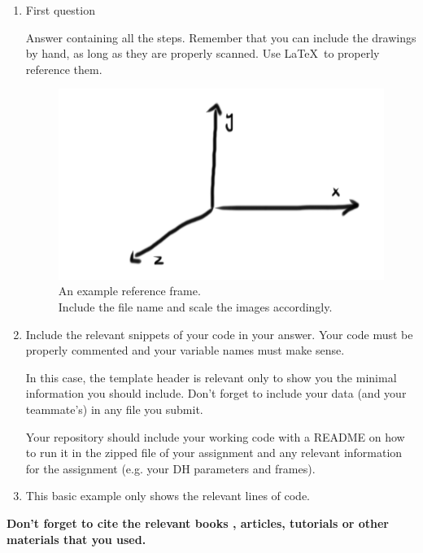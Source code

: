 \documentclass[paper=a4, fontsize=11pt]{scrartcl}
\begin{document}
\begin{enumerate}
	\item First question
	
	Answer containing all the steps. Remember that you can include the drawings by hand, as long as they are properly scanned. Use \LaTeX ~to properly reference them. 
	\begin{figure}[h]
		\label{fig:frame}
		\begin{center}
			\caption{An example reference frame. \\ Include the file name and scale the images accordingly.}
			\includegraphics[width=.3\textwidth]{images/Frame}
		\end{center}	
	\end{figure}
	
	\item Include the relevant snippets of your code in your answer. 
	Your code must be properly commented and your variable names must make sense.
	 
	In this case, the template header is relevant only to show you the minimal information you should include. Don't forget to include your data (and your teammate's) in any file you submit.
	
	
	Your repository should include your working code with a README on how to run it in the zipped file of your assignment and any relevant information for the assignment (e.g. your DH parameters and frames). 

	\item This basic example only shows the relevant lines of code.
	

\end{enumerate}

\textbf{\Large Don't forget to cite the relevant books \cite{craig2005}, articles, tutorials or other materials that you used.}



\end{document}
